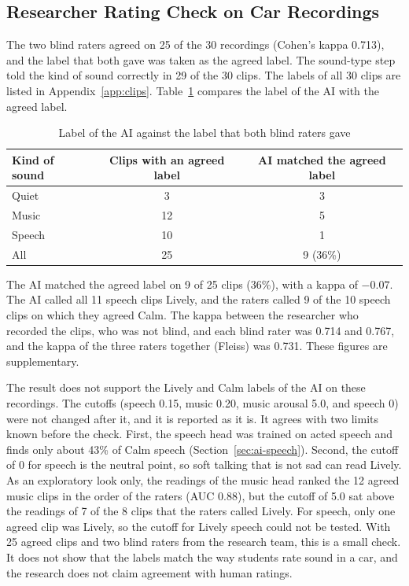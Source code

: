 \subsection{Researcher Rating Check on Car Recordings}
\label{sec:ai-rating}
The two blind raters agreed on 25 of the 30 recordings (Cohen's kappa 0.713), and the label that both gave was taken as the agreed label. The sound-type step told the kind of sound correctly in 29 of the 30 clips. The labels of all 30 clips are listed in Appendix~\ref{app:clips}. Table~\ref{tab:ai-raters} compares the label of the AI with the agreed label.

\begin{table}[htbp]
    \centering
    \caption{Label of the AI against the label that both blind raters gave}\label{tab:ai-raters}
    \small
    \renewcommand{\arraystretch}{1.2}
    \begin{tabular}{|l|c|c|}
        \hline
        \textbf{Kind of sound} & \textbf{Clips with an agreed label} & \textbf{AI matched the agreed label} \\
        \hline
        Quiet & 3 & 3 \\
        \hline
        Music & 12 & 5 \\
        \hline
        Speech & 10 & 1 \\
        \hline
        All & 25 & 9 (36\%) \\
        \hline
    \end{tabular}
\end{table}

The AI matched the agreed label on 9 of 25 clips (36\%), with a kappa of $-0.07$. The AI called all 11 speech clips Lively, and the raters called 9 of the 10 speech clips on which they agreed Calm. The kappa between the researcher who recorded the clips, who was not blind, and each blind rater was 0.714 and 0.767, and the kappa of the three raters together (Fleiss) was 0.731. These figures are supplementary.

The result does not support the Lively and Calm labels of the AI on these recordings. The cutoffs (speech 0.15, music 0.20, music arousal 5.0, and speech 0) were not changed after it, and it is reported as it is. It agrees with two limits known before the check. First, the speech head was trained on acted speech and finds only about 43\% of Calm speech (Section~\ref{sec:ai-speech}). Second, the cutoff of 0 for speech is the neutral point, so soft talking that is not sad can read Lively. As an exploratory look only, the readings of the music head ranked the 12 agreed music clips in the order of the raters (AUC 0.88), but the cutoff of 5.0 sat above the readings of 7 of the 8 clips that the raters called Lively. For speech, only one agreed clip was Lively, so the cutoff for Lively speech could not be tested. With 25 agreed clips and two blind raters from the research team, this is a small check. It does not show that the labels match the way students rate sound in a car, and the research does not claim agreement with human ratings.

